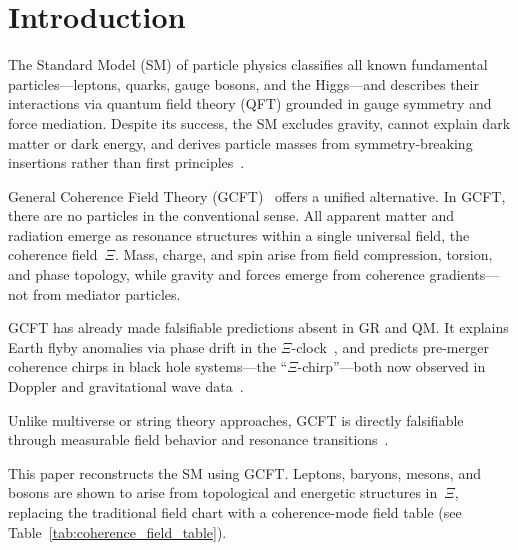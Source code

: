\section{Introduction}

The Standard Model (SM) of particle physics classifies all known fundamental particles—leptons, quarks, gauge bosons, and the Higgs—and describes their interactions via quantum field theory (QFT) grounded in gauge symmetry and force mediation. Despite its success, the SM excludes gravity, cannot explain dark matter or dark energy, and derives particle masses from symmetry-breaking insertions rather than first principles~\cite{Smolin2006}.

General Coherence Field Theory (GCFT)~\cite{Hacquier2025a, Hacquier2025b} offers a unified alternative. In GCFT, there are no particles in the conventional sense. All apparent matter and radiation emerge as resonance structures within a single universal field, the coherence field~$\Xi$. Mass, charge, and spin arise from field compression, torsion, and phase topology, while gravity and forces emerge from coherence gradients—not from mediator particles.

GCFT has already made falsifiable predictions absent in GR and QM. It explains Earth flyby anomalies via phase drift in the $\Xi$-clock~\cite{Anderson2008, Hacquier2025a}, and predicts pre-merger coherence chirps in black hole systems—the ``$\Xi$-chirp''—both now observed in Doppler and gravitational wave data~\cite{Hacquier2025c}.

Unlike multiverse or string theory approaches, GCFT is directly falsifiable through measurable field behavior and resonance transitions~\cite{Popper1959, Tegmark2007}.

This paper reconstructs the SM using GCFT. Leptons, baryons, mesons, and bosons are shown to arise from topological and energetic structures in~$\Xi$, replacing the traditional field chart with a coherence-mode field table (see Table~\ref{tab:coherence_field_table}).
